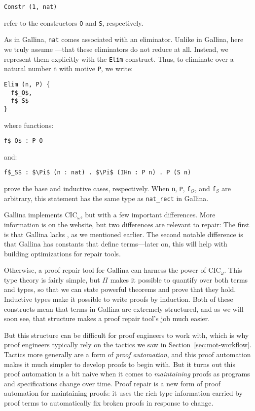 \begin{lstlisting}
Constr (1, nat)
\end{lstlisting}
refer to the constructors \lstinline{O} and \lstinline{S}, respectively.

As in Gallina, \lstinline{nat} comes associated with an eliminator.
Unlike in Gallina, here we truly assume ---that these eliminators
do not reduce at all.
Instead, we represent them explicitly with the \lstinline{Elim} construct.
Thus, to eliminate over a natural number \lstinline{n} with motive \lstinline{P},
we write: %

\begin{lstlisting}
Elim (n, P) {
  f$_O$,
  f$_S$
}
\end{lstlisting}
where functions:

\begin{lstlisting}
f$_O$ : P O
\end{lstlisting}
and:

\begin{lstlisting}
f$_S$ : $\Pi$ (n : nat) . $\Pi$ (IHn : P n) . P (S n)
\end{lstlisting}
prove the base and inductive cases, respectively.
When \lstinline{n}, \lstinline{P}, \lstinline{f}$_O$, and \lstinline{f}$_S$ are arbitrary,
this statement has the same type as \lstinline{nat_rect} in Gallina.

Gallina implements CIC$_{\omega}$, but with a few important differences.
More information is on the website, %
but two differences are relevant to repair:
The first is that Gallina lacks , as we mentioned earlier.
The second notable difference is that Gallina has constants that define terms---later on, this will help with building optimizations for repair tools.

Otherwise, a proof repair tool for Gallina can harness the power of CIC$_{\omega}$. This type theory is fairly simple,
but $\Pi$ makes it possible to quantify over both terms and types,
so that we can state powerful theorems and prove that they hold.
Inductive types make it possible to write proofs by induction.
Both of these constructs mean that terms in Gallina are extremely structured,
and as we will soon see, that structure makes a proof repair tool's job much easier.

But this structure can be difficult for proof engineers to work with,
which is why proof engineers typically rely on the tactics we saw in Section~\ref{sec:mot-workflow}.
Tactics more generally are a form of \textit{proof automation}, and this proof automation makes it much
simpler to develop proofs to begin with.
But it turns out this proof automation is a bit naive when it comes to \textit{maintaining} proofs
as programs and specifications change over time.
Proof repair is a new form of proof automation for maintaining proofs: it uses the rich type information carried by proof terms
to automatically fix broken proofs in response to change.


